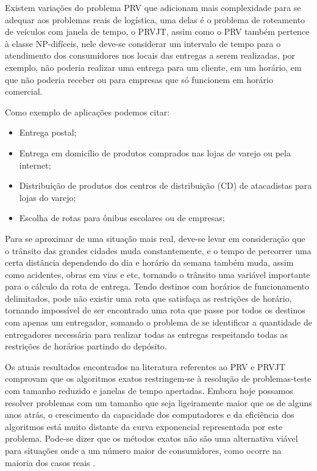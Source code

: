 Existem variações do problema PRV que adicionam mais complexidade para se adequar aos problemas reais de logística, uma delas é o problema de roteamento de veículos com janela de tempo, o PRVJT, assim como o PRV também pertence à classe NP-difíceis, nele deve-se considerar um intervalo de tempo para o atendimento dos consumidores nos locais das entregas a serem realizadas, por exemplo, não poderia realizar uma entrega para um cliente, em um horário, em que não poderia receber ou para empresas que só funcionem em horário comercial. 

Como exemplo de aplicações podemos citar:
\begin{itemize}
	\item Entrega postal;
	\item Entrega em domicílio de produtos comprados nas lojas de varejo ou pela internet;
	\item Distribuição de produtos dos centros de distribuição (CD) de atacadistas para lojas do varejo;
	\item Escolha de rotas para ônibus escolares ou de empresas;
\end{itemize}

Para se aproximar de uma situação mais real, deve-se levar em consideração que o trânsito das grandes cidades muda constantemente, e o tempo de percorrer uma certa distância dependendo do dia e horário da semana também muda, assim como acidentes, obras em vias e etc, tornando o trânsito uma variável importante para o cálculo da rota de entrega. Tendo destinos com horários de funcionamento delimitados, pode não existir uma rota que satisfaça as restrições de horário, tornando impossível de ser encontrado uma rota que passe por todos os destinos com apenas um entregador, somando o problema de se identificar a quantidade de entregadores necessária para realizar todas as entregas respeitando todas as restrições de horários partindo do depósito. 

Os atuais resultados encontrados na literatura referentes ao PRV e PRVJT comprovam que os algoritmos exatos restringem-se à resolução de problemas-teste com tamanho reduzido e janelas de tempo apertadas. Embora hoje possamos resolver problemas com um tamanho que seja ligeiramente maior que os de alguns anos atrás, o crescimento da capacidade dos computadores e da eficiência dos algoritmos está muito distante da curva exponencial representada por este problema. Pode-se dizer que os métodos exatos não são uma alternativa viável para situações onde a um número maior de consumidores, como ocorre na maioria dos casos reais \cite{Chabrier}.

